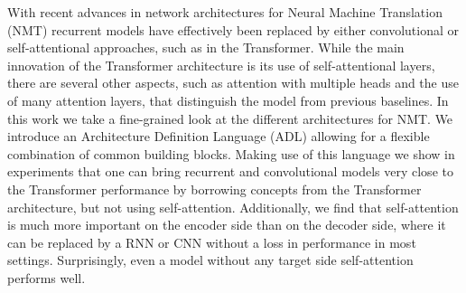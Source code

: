 With recent advances in network architectures for Neural Machine Translation (NMT) recurrent models have effectively been replaced by either convolutional or self-attentional approaches, such as in the Transformer. While the main innovation of the Transformer architecture is its use of self-attentional layers, there are several other aspects, such as attention with multiple heads and the use of many attention layers, that distinguish the model from previous baselines. In this work we take a fine-grained look at the different architectures for NMT. We introduce an Architecture Definition Language (ADL) allowing for a flexible combination of common building blocks. Making use of this language we show in experiments that one can bring recurrent and convolutional models very close to the Transformer performance by borrowing concepts from the Transformer architecture, but not using self-attention. Additionally, we find that self-attention is much more important on the encoder side than on the decoder side, where it can be replaced by a RNN or CNN without a loss in performance in most settings. Surprisingly, even a model without any target side self-attention performs well.
